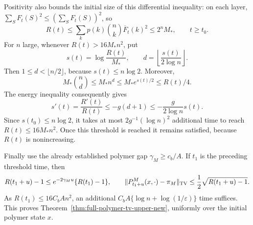 Positivity also bounds the initial size of this differential inequality:
on each layer, $\sum_SF_t(S)^2\leq(\sum_SF_t(S))^2$, so
\[
 R(t)\leq\sum_kp(k)\binom nk\overline F_t(k)^2
       \leq2^nM_*,\qquad t\geq t_0.
\]
For $n$ large, whenever $R(t)>16M_*n^2$, put
\[
 s(t)=\log\frac{R(t)}{M_*},\qquad
 d=\left\lfloor\frac{s(t)}{2\log n}\right\rfloor.
\]
Then $1\leq d<\lfloor n/2\rfloor$, because
$s(t)\leq n\log2$. Moreover,
\[
 M_*\binom nd\leq M_*n^d\leq M_*e^{s(t)/2}\leq R(t)/4.
\]
The energy inequality consequently gives
\[
 s'(t)=\frac{R'(t)}{R(t)}
 \leq-g(d+1)\leq-\frac{g}{2\log n}s(t).
\]
Since $s(t_0)\leq n\log2$, it takes at most
$2g^{-1}(\log n)^2$ additional time to reach
$R(t)\leq16M_*n^2$. Once this threshold is reached it remains satisfied,
because $R(t)$ is nonincreasing.

Finally use the already established polymer gap
$\gamma_M\geq c_b/A$. If $t_1$ is the preceding threshold time, then
\[
 R(t_1+u)-1\leq e^{-2\gamma_Mu}\{R(t_1)-1\},\qquad
 \|P^M_{t_1+u}(x,\cdot)-\pi_M\|_{\rm TV}
 \leq\frac12\sqrt{R(t_1+u)-1}.
\]
As $R(t_1)\leq16C_bAn^2$, an additional
$C_bA\{\log n+\log(1/\varepsilon)\}$ time suffices. This proves
Theorem~\ref{thm:full-polymer-tv-upper-new}, uniformly over the initial
polymer state $x$.
